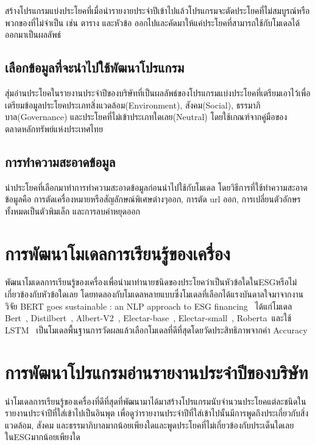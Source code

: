 \enskip \enskip \enskip สร้างโปรแกรมแบ่งประโยคที่เมื่อนำรายงายประจำปีเข้าไปแล้วโปรแกรมจะตัดประโยคที่ไม่สมบูรณ์หรือพวกของที่ไม่จำเป็น 
เช่น ตาราง และหัวข้อ ออกไปและคัดมาให้แค่ประโยคที่สามารถใช้กับโมเดลได้ออกมาเป็นผลลัพธ์


\subsection{เลือกข้อมูลที่จะนำไปใช้พัฒนาโปรแกรม}

\enskip \enskip \enskip สุ่มอ่านประโยคในรายงานประจำปีของบริษัทที่เป็นผลลัพธ์ของโปรแกรมแบ่งประโยคที่เตรียมเอาไว้เพื่อเตรียมข้อมูลประโยคประเภทสิ่งแวดล้อม(Environment), 
สังคม(Social), ธรรมาภิบาล(Governance) และประโยคที่ไม่เข้าประเภทใดเลย(Neutral) โดยใช้เกณฑ์จากคู่มือของตลาดหลักทรัพย์แห่งประเทศไทย ~\cite{sus}
  

\subsection{การทำความสะอาดข้อมูล}

\enskip \enskip \enskip นำประโยคที่เลือกมาทำการทำความสะอาดข้อมูลก่อนนำไปใช้กับโมเดล 
โดยวิธีการที่ใช้ทำความสะอาดข้อมูลคือ การตัดเครื่องหมายหรือสัญลักษณ์พิเศษต่างๆออก, การตัด url ออก, การเปลี่ยนตัวอักษรทั้งหมดเป็นตัวพิมเล็ก และการลบคำหยุดออก


\section{การพัฒนาโมเดลการเรียนรู้ของเครื่อง}

\enskip \enskip \enskip พัฒนาโมเดลการเรียนรู้ของเครื่องเพื่อนำมาทำนายชนิดของประโยคว่าเป็นหัวข้อใดในESGหรือไม่เกี่ยวข้องกับหัวข้อใดเลย 
โดยทดลองกับโมเดลหลายแบบซึ่งโมเดลที่เลือกได้แรงบันดาลใจมาจากงานวิจัย BERT goes sustainable : an NLP approach to ESG financing~\cite{torroni2021bert} ได้แก่โมเดล Bert~\cite{devlin2018bert}, Distilbert~\cite{sanh2019distilbert}, Albert-V2~\cite{lan2019albert}, Electar-base~\cite{clark2020electra}, Electar-small~\cite{clark2020electra}, Roberta~\cite{liu2019roberta}และใช้ LSTM~\cite{staudemeyer2019understanding} เป็นโมเดลพื้นฐานการวัดผลแล้วเลือกโมเดลที่ดีที่สุดโดยวัดประสิทธิภาพจากค่า Accuracy


\section{การพัฒนาโปรแกรมอ่านรายงานประจำปีของบริษัท}

\enskip \enskip \enskip นำโมเดลการเรียนรู้ของเครื่องที่ดีที่สุดที่พัฒนามาได้มาสร้างโปรแกรมนับจำนวนประโยคแต่ละชนิดในรายงานประจำปีที่ใส่เข้าไปเป็นอินพุต
เพื่อดูว่ารายงานประจำปีที่ใส่เข้าไปนั้นมีการพูดถึงประเกี่ยวกับสิ่งแวดล้อม, 
สังคม และธรรมาภิบาลมากน้อยเพียงใดและพูดประโยคที่ไม่เกี่ยวข้องกับประเด็นใดเลยในESGมากน้อยเพียงใด



